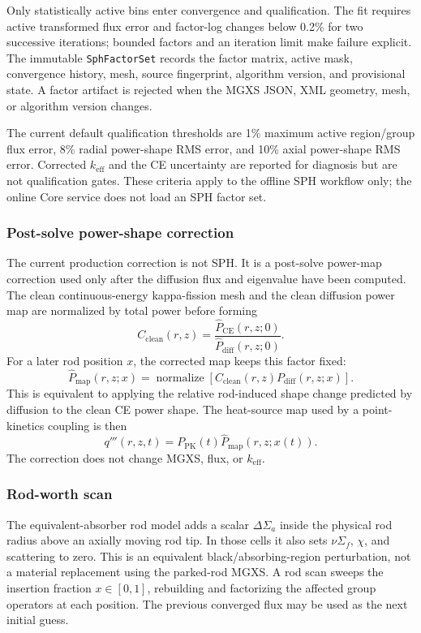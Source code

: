 \documentclass[11pt]{article}
\begin{document}
Only statistically active bins enter convergence and qualification.  The fit
requires active transformed flux error and factor-log changes below 0.2\% for
two successive iterations; bounded factors and an iteration limit make failure
explicit.  The immutable \texttt{SphFactorSet} records the factor matrix,
active mask, convergence history, mesh, source fingerprint, algorithm version,
and provisional state.  A factor artifact is rejected when the MGXS JSON, XML
geometry, mesh, or algorithm version changes.

The current default qualification thresholds are 1\% maximum active
region/group flux error, 8\% radial power-shape RMS error, and 10\% axial
power-shape RMS error.  Corrected $k_{\mathrm{eff}}$ and the CE uncertainty are
reported for diagnosis but are not qualification gates.  These criteria apply
to the offline SPH workflow only; the online Core service does not load an SPH
factor set.

\subsubsection{Post-solve power-shape correction}

The current production correction is not SPH.  It is a post-solve power-map
correction used only after the diffusion flux and eigenvalue have been
computed.  The clean continuous-energy kappa-fission mesh and the clean
diffusion power map are normalized by total power before forming
\[
C_{\mathrm{clean}}(r,z)
= \frac{\widehat{P}_{\mathrm{CE}}(r,z;0)}
       {\widehat{P}_{\mathrm{diff}}(r,z;0)} .
\]
For a later rod position $x$, the corrected map keeps this factor fixed:
\[
\widehat{P}_{\mathrm{map}}(r,z;x)
= \operatorname{normalize}\left[
  C_{\mathrm{clean}}(r,z) P_{\mathrm{diff}}(r,z;x)
\right].
\]
This is equivalent to applying the relative rod-induced shape change predicted
by diffusion to the clean CE power shape.  The heat-source map used by a
point-kinetics coupling is then
\[
q'''(r,z,t)
= P_{\mathrm{PK}}(t)\widehat{P}_{\mathrm{map}}(r,z;x(t)).
\]
The correction does not change MGXS, flux, or $k_{\mathrm{eff}}$.

\subsubsection{Rod-worth scan}

The equivalent-absorber rod model adds a scalar $\Delta\Sigma_a$ inside the
physical rod radius above an axially moving rod tip.  In those cells it also
sets $\nu\Sigma_f$, $\chi$, and scattering to zero.  This is an equivalent
black/absorbing-region perturbation, not a material replacement using the
parked-rod MGXS.  A rod scan sweeps the insertion fraction
$x \in [0,1]$, rebuilding and factorizing the affected group operators at each
position.  The previous converged flux may be used as the next initial guess.
\end{document}
